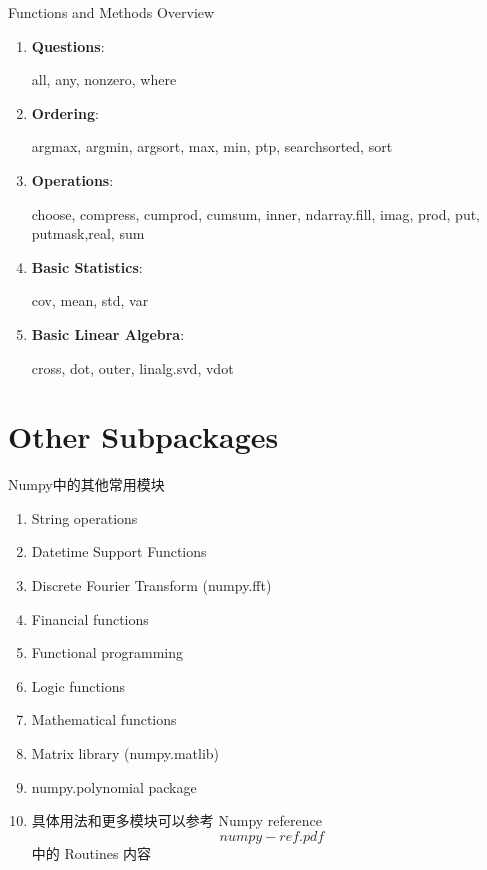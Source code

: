 \documentclass[ignorenonframetext,11pt,xcolor=dvipsnames,hyperref={colorlinks,allcolors=.,urlcolor=blue, citecolor=violet, bookmarksdepth=4},aspectratio=1610]{beamer}
\providecommand{\tightlist}{%
  \setlength{\itemsep}{0pt}\setlength{\parskip}{0pt}}
\begin{document}
\begin{frame}{Functions and Methods Overview}
\protect\hypertarget{functions-and-methods-overview-2}{}

\begin{enumerate}
\item
  \textbf{Questions}:

  all, any, nonzero, where
\item
  \textbf{Ordering}:

  argmax, argmin, argsort, max, min, ptp, searchsorted, sort
\item
  \textbf{Operations}:

  choose, compress, cumprod, cumsum, inner, ndarray.fill, imag, prod,
  put, putmask,real, sum
\item
  \textbf{Basic Statistics}:

  cov, mean, std, var
\item
  \textbf{Basic Linear Algebra}:

  cross, dot, outer, linalg.svd, vdot
\end{enumerate}

\end{frame}

\hypertarget{other-subpackages}{%
\section{Other Subpackages}\label{other-subpackages}}

\begin{frame}{Numpy中的其他常用模块}
\protect\hypertarget{numpy-1}{}

\begin{enumerate}
\tightlist
\item
  String operations
\item
  Datetime Support Functions
\item
  Discrete Fourier Transform (numpy.fft)
\item
  Financial functions
\item
  Functional programming
\item
  Logic functions
\item
  Mathematical functions
\item
  Matrix library (numpy.matlib)
\item
  numpy.polynomial package
\item
  具体用法和更多模块可以参考 Numpy reference\[numpy-ref.pdf\]中的
  Routines 内容
\end{enumerate}

\end{frame}
\end{document}
